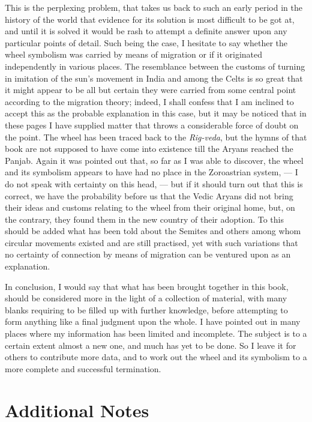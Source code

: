 \documentclass[a4paper, 11pt, oneside, polutonikogreek, english]{article}
\begin{document}
This is the perplexing problem, that takes us back to such an early period in the history of the world that evidence for its solution is most difficult to be got at, and until it is solved it would be rash to attempt a definite answer upon any particular points of detail. Such being the case, I hesitate to say whether the wheel symbolism was carried by means of migration or if it originated independently in various places. The resemblance between the customs of turning in imitation of the sun's movement in India and among the Celts is so great that it might appear to be all but certain they were carried from some central point according to the migration theory; indeed, I shall confess that I am inclined to accept this as the probable explanation in this case, but it may be noticed that in these pages I have supplied matter that throws a considerable force of doubt on the point. The wheel has been traced back to the \emph{Rig-veda}, but the hymns of that book are not supposed to have come into existence till the Aryans reached the Panjab. Again it was pointed out that, so far as I was able to discover, the wheel and its symbolism appears to have had no place in the Zoroastrian system, --- I do not speak with certainty on this head, --- but if it should turn out that this is correct, we have the probability before us that the Vedic Aryans did not bring their ideas and customs relating to the wheel from their original home, but, on the contrary, they found them in the new country of their adoption. To this should be added what has been told about the Semites and others among whom circular movements existed and are still practised, yet with such variations that no certainty of connection by means of migration can be ventured upon as an explanation.

In conclusion, I would say that what has been brought together in this book, should be considered more in the light of a collection of material, with many blanks requiring to be filled up with further knowledge, before attempting to form anything like a final judgment upon the whole. I have pointed out in many places where my information has been limited and incomplete. The subject is to a certain extent almost a new one, and much has yet to be done. So I leave it for others to contribute more data, and to work out the wheel and its symbolism to a more complete and successful termination.
\clearpage
\section{Additional Notes}
\end{document}

